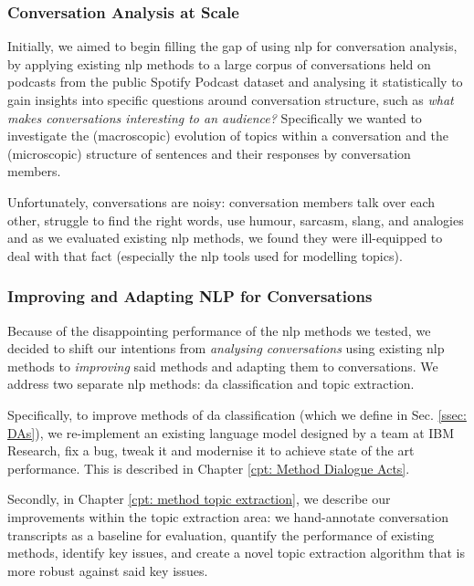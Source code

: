 \subsubsection{Conversation Analysis at Scale}
Initially, we aimed to begin filling the gap of using \gls{nlp} for conversation analysis, by applying existing \gls{nlp} methods to a large corpus of conversations held on podcasts from the public Spotify Podcast dataset\cite{clifton-2020100000} and analysing it statistically to gain insights into specific questions around conversation structure, such as \textit{what makes conversations interesting to an audience?} Specifically we wanted to investigate the (macroscopic) evolution of topics within a conversation and the (microscopic) structure of sentences and their responses by conversation members. 

Unfortunately, conversations are noisy: conversation members talk over each other, struggle to find the right words, use humour, sarcasm, slang, and analogies and as we evaluated existing \gls{nlp} methods, we found they were ill-equipped to deal with that fact (especially the \gls{nlp} tools used for modelling topics).

\subsubsection{Improving and Adapting NLP for Conversations}
Because of the disappointing performance of the \gls{nlp} methods we tested, we decided to shift our intentions from \textit{analysing conversations} using existing \gls{nlp} methods to \textit{improving} said methods and adapting them to conversations. We address two separate \gls{nlp} methods: \gls{da} classification and topic extraction.

Specifically, to improve methods of \gls{da} classification (which we define in Sec. \ref{ssec: DAs}), we re-implement an existing language \gls{model} designed by a team at IBM Research\cite{kumar2017dialogue}, fix a bug, tweak it and modernise it to achieve state of the art performance. This is described in Chapter \ref{cpt: Method Dialogue Acts}.

Secondly, in Chapter \ref{cpt: method topic extraction}, we describe our improvements within the topic extraction area: we hand-annotate conversation transcripts as a baseline for evaluation, quantify the performance of existing methods, identify key issues, and create a novel topic extraction algorithm that is more robust against said key issues.

